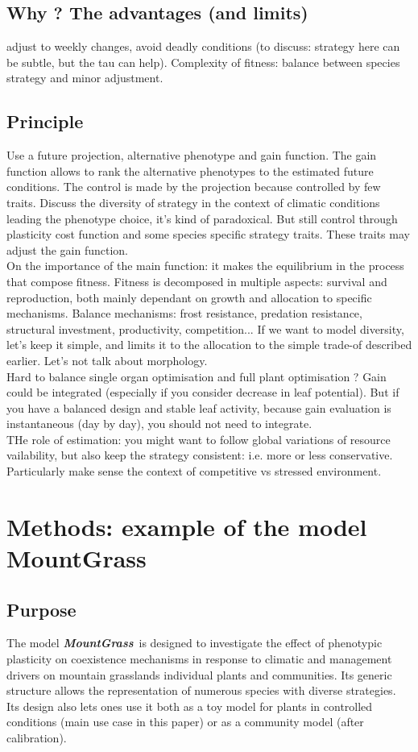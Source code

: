 \documentclass[review]{elsarticle}
\newcommand{\model}{\textbf{\textit{MountGrass}}~}
\begin{document}
\subsection{Why ? The advantages (and limits)}
adjust to weekly changes, avoid deadly conditions (to discuss: strategy here can be subtle, but the tau can help). Complexity of fitness: balance between species strategy and minor adjustment. 

\subsection{Principle}
Use a future projection, alternative phenotype and gain function. The gain function allows to rank the alternative phenotypes to the estimated future conditions. The control is made by the projection because controlled by few traits. Discuss the diversity of strategy in the context of climatic conditions leading the phenotype choice, it's kind of paradoxical. But still control through plasticity cost function and some species specific strategy traits. These traits may adjust the gain function. \\
On the importance of the main function: it makes the equilibrium in the process that compose fitness. Fitness is decomposed in multiple aspects: survival and reproduction, both mainly dependant on growth and allocation to specific mechanisms. Balance mechanisms: frost resistance, predation resistance, structural investment, productivity, competition... If we want to model diversity, let's keep it simple, and limits it to the allocation to the simple trade-of described earlier. Let's not talk about morphology.\\
Hard to balance single organ optimisation and full plant optimisation ? Gain could be integrated (especially if you consider decrease in leaf potential). But if you have a balanced design and stable leaf activity, because gain evaluation is instantaneous (day by day), you should not need to integrate.\\
THe role of estimation: you might want to follow global variations of resource vailability, but also keep the strategy consistent: i.e. more or less conservative. Particularly make sense the context of competitive vs stressed environment.

\section{Methods: example of the model MountGrass}
\subsection{Purpose}
The model \model is designed to investigate the effect of phenotypic plasticity on coexistence mechanisms in response to climatic and management drivers on mountain grasslands individual plants and communities. Its generic structure allows the representation of numerous species with diverse strategies. Its design also lets ones use it both as a toy model for plants in controlled conditions (main use case in this paper) or as a community model (after calibration).\\
\end{document}
